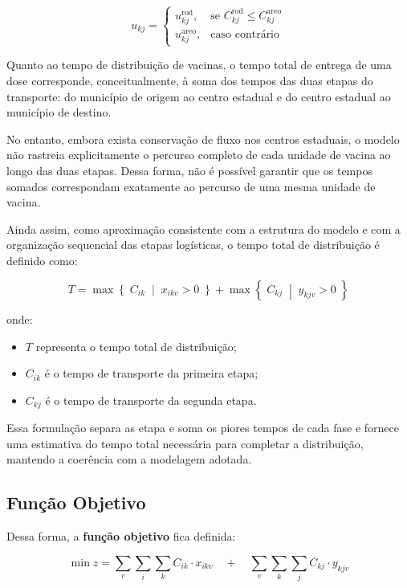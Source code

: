 \begin{equation}
u_{kj} =
\begin{cases}
u_{kj}^{\text{rod}}, & \text{se } C_{kj}^{\text{rod}} \le C_{kj}^{\text{areo}} \\
u_{kj}^{\text{areo}}, & \text{caso contrário}
\end{cases}
\end{equation}

Quanto ao tempo de distribuição de vacinas, o tempo total de entrega de uma dose corresponde, conceitualmente, à soma dos tempos das duas etapas do transporte: do município de origem ao centro estadual e do centro estadual ao município de destino.

No entanto, embora exista conservação de fluxo nos centros estaduais, o modelo não rastreia explicitamente o percurso completo de cada unidade de vacina ao longo das duas etapas. Dessa forma, não é possível garantir que os tempos somados correspondam exatamente ao percurso de uma mesma unidade de vacina.

Ainda assim, como aproximação consistente com a estrutura do modelo e com a organização sequencial das etapas logísticas, o tempo total de distribuição é definido como:

\[
T = \max \left\{ \; C_{ik} \;\middle|\; x_{ikv} > 0 \; \right\} + \max \left\{ \; C_{kj} \;\middle|\; y_{kjv} > 0 \; \right\}
\]

onde:
\begin{itemize}
    \item $T$ representa o tempo total de distribuição;
    \item $C_{ik}$ é o tempo de transporte da primeira etapa;
    \item $C_{kj}$ é o tempo de transporte da segunda etapa.
\end{itemize}

Essa formulação separa as etapa e soma os piores tempos de cada fase e fornece uma estimativa do tempo total necessária para completar a distribuição, mantendo a coerência com a modelagem adotada.


\subsection{Função Objetivo}

Dessa forma, a \textbf{função objetivo} fica definida:

\begin{equation}
    \min z = \sum_{v} \sum_{i} \sum_{k} C_{ik} \cdot x_{ikv} \quad + \quad \sum_{v} \sum_{k} \sum_{j} C_{kj} \cdot y_{kjv}
    \label{eq:intermunicipal_estendido}
\end{equation}

